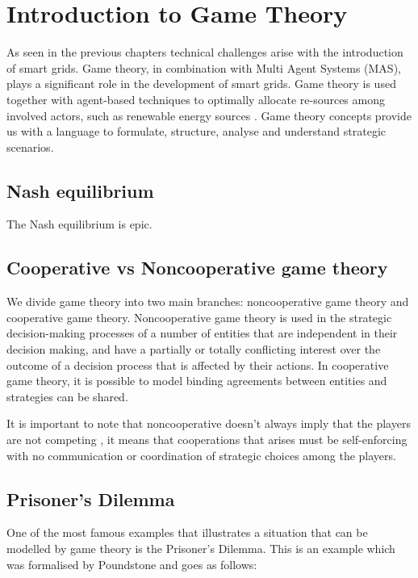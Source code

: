 \section{Introduction to Game Theory}
As seen in the previous chapters technical challenges arise with the introduction of smart grids. Game theory, in combination with Multi Agent Systems (MAS), plays a significant role in the development of smart grids. Game theory is used together with agent-based techniques to optimally allocate re-sources among involved actors, such as renewable energy sources \cite{nguyen2013game}. Game theory concepts provide us with a language to formulate, structure, analyse and understand strategic scenarios.

\subsection{Nash equilibrium}
The Nash equilibrium is epic.

\subsection{Cooperative vs Noncooperative game theory}
We divide game theory into two main branches: noncooperative game theory and cooperative game theory. Noncooperative game theory is used in the strategic decision-making processes of a number of entities that are independent in their decision making, and have a partially or totally conflicting interest over the outcome of a decision process that is affected by their actions\cite{keypaper}. In cooperative game theory, it is possible to model binding agreements between entities and strategies can be shared. 

It is important to note that noncooperative doesn't always imply that the players are not competing , it means that cooperations that arises must be self-enforcing with no communication or coordination of strategic choices among the players.\cite{keypaper}

\subsection{Prisoner's Dilemma}
One of the most famous examples that illustrates a situation that can be modelled by game theory is the Prisoner's Dilemma. This is an example which was formalised by Poundstone \cite{poundstone} and goes as follows: 

